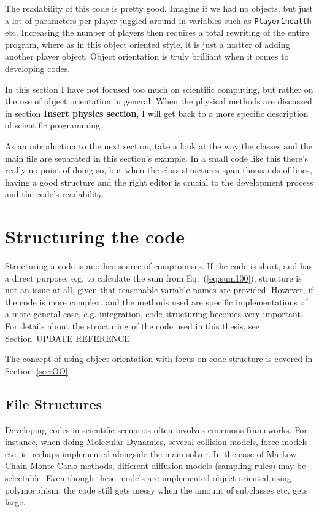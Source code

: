 The readability of this code is pretty good. Imagine if we had no objects, but just a lot of parameters per player juggled around in variables such as \verb+Player1health+ etc. Increasing the number of players then requires a total rewriting of the entire program, where as in this object oriented style, it is just a matter of adding another player object. Object orientation is truly brilliant when it comes to developing codes. 

In this section I have not focused too much on scientific computing, but rather on the use of object orientation in general. When the physical methods are discussed in section \textbf{Insert physics section}, I will get back to a more specific description of scientific programming.

As an introduction to the next section, take a look at the way the classes and the main file are separated in this section's example. In a small code like this there's really no point of doing so, but when the class structures span thousands of lines, having a good structure and the right editor is crucial to the development process and the code's readability.


\section{Structuring the code}

Structuring a code is another source of compromises. If the code is short, and has a direct purpose, e.g. to calculate the sum from Eq.~(\ref{eq:sum100}), structure is not an issue at all, given that reasonable variable names are provided. However, if the code is more complex, and the methods used are specific implementations of a more general case, e.g. integration, code structuring becomes very important. For details about the structuring of the code used in this thesis, see Section~UPDATE REFERENCE

The concept of using object orientation with focus on code structure is covered in Section~\ref{sec:OO}.

\subsection{File Structures}

Developing codes in scientific scenarios often involves enormous frameworks. For instance, when doing Molecular Dynamics, several collision models, force models etc. is perhaps implemented alongside the main solver. In the case of Markow Chain Monte Carlo methods, different diffusion models (sampling rules) may be selectable. Even though these models are implemented object oriented using polymorphism, the code still gets messy when the amount of subclasses etc. gets large. 

